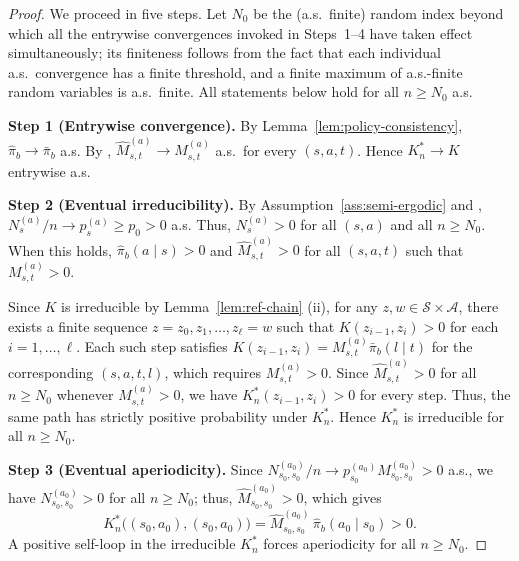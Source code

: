 \documentclass{article}
\numberwithin{equation}{section}
\begin{document}
\begin{proof}
We proceed in five steps. Let $N_0$ be the (a.s.\ finite) random index beyond which all the entrywise convergences invoked in Steps~1--4 have taken effect simultaneously; its finiteness follows from the fact that each individual a.s.\ convergence has a finite threshold, and a finite maximum of a.s.-finite random variables is a.s.\ finite. All statements below hold for all $n\ge N_0$ a.s.

\medskip\noindent\textbf{Step 1 (Entrywise convergence).}
By Lemma~\ref{lem:policy-consistency}, $\hat\pi_b\to\bar\pi_b$ a.s. By \citet[Lemma~2]{su2025centrallimittheoremstransition}, $\hat M_{s,t}^{(a)}\to M_{s,t}^{(a)}$ a.s.\ for every $(s,a,t)$. Hence $K_n^\ast\to K$ entrywise a.s.

\medskip\noindent\textbf{Step 2 (Eventual irreducibility).}
By Assumption~\ref{ass:semi-ergodic} and \citet[Lemma~2]{su2025centrallimittheoremstransition}, $N_s^{(a)}/n\to p_s^{(a)}\ge p_0>0$ a.s.
Thus, $N_s^{(a)}>0$ for all $(s,a)$ and all $n\ge N_0$. When this holds, $\hat\pi_b(a \mid s)>0$ and $\hat M_{s,t}^{(a)}>0$ for all $(s,a,t)$ such that $M_{s,t}^{(a)}>0$.

Since $K$ is irreducible by Lemma~\ref{lem:ref-chain}  (ii), for any $z,w\in\mathcal{S}\times\mathcal{A}$, there exists a finite sequence $z=z_0,z_1,\ldots,z_\ell=w$ such that $K(z_{i-1},z_i)>0$ for each $i=1,\ldots,\ell$. Each such step satisfies $K(z_{i-1},z_i)=M_{s,t}^{(a)}\bar\pi_b(l\mid t)$ for the corresponding $(s,a,t,l)$, which requires $M_{s,t}^{(a)}>0$.
Since $\hat M_{s,t}^{(a)}>0$ for all $n\ge N_0$ whenever $M_{s,t}^{(a)}>0$, we have $K_n^\ast(z_{i-1},z_i)>0$ for every step. 
Thus, the same path has strictly positive probability under $K_n^\ast$. Hence $K_n^\ast$ is irreducible for all $n\ge N_0$.

\medskip\noindent\textbf{Step 3 (Eventual aperiodicity).}
Since $N_{s_0,s_0}^{(a_0)}/n\to p_{s_0}^{(a_0)}M_{s_0,s_0}^{(a_0)}>0$ a.s., we have $N_{s_0,s_0}^{(a_0)}>0$ for all $n\ge N_0$; thus, $\hat M_{s_0,s_0}^{(a_0)}>0$, which gives
\[
K_n^\ast\bigl((s_0,a_0),(s_0,a_0)\bigr) = \hat M_{s_0,s_0}^{(a_0)}\,\hat\pi_b(a_0\mid s_0)>0.
\]
A positive self-loop in the irreducible $K_n^\ast$ forces aperiodicity for all $n\ge N_0$.


\end{proof}
\end{document}
